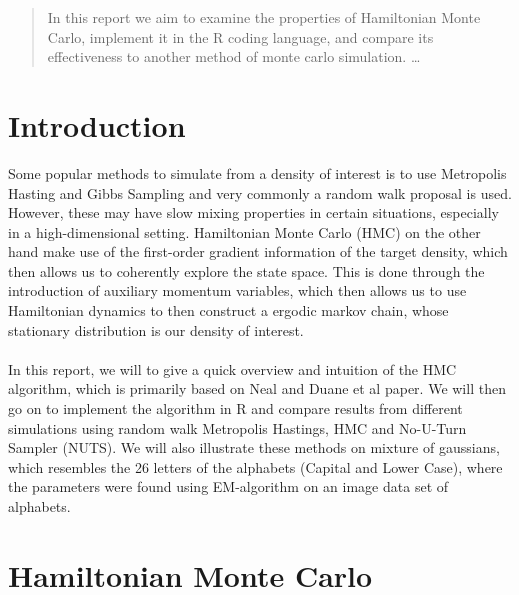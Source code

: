 \documentclass[11pt]{article}
\begin{document}
\maketitle

\begin{abstract}
In this report we aim to examine the properties of Hamiltonian Monte Carlo, implement it in the R coding language, and compare its effectiveness to another method of monte carlo simulation. \ldots
\end{abstract}
\newpage
\section{Introduction}
Some popular methods to simulate from a density of interest is to use Metropolis Hasting and Gibbs Sampling and very commonly a random walk proposal is used. However, these may have slow mixing properties in certain situations, especially in a high-dimensional setting. Hamiltonian Monte Carlo (HMC) on the other hand make use of the first-order gradient information of the target density, which then allows us to coherently explore the state space. This is done through the introduction of auxiliary momentum variables, which then allows us to use Hamiltonian dynamics  to then construct a ergodic markov chain, whose stationary distribution is our density of interest. 
\\
\\
In this report, we will to give a quick overview and intuition of the HMC algorithm, which is primarily based on Neal\cite{neal} and Duane et al\cite{duane} paper. We will then go on to implement the algorithm in R and compare results from different simulations using random walk Metropolis Hastings, HMC and No-U-Turn Sampler (NUTS). We will also illustrate these methods on mixture of gaussians, which resembles the 26 letters of the alphabets (Capital and Lower Case), where the parameters were found using EM-algorithm on an image data set of alphabets.
\section{Hamiltonian Monte Carlo}
\end{document}
